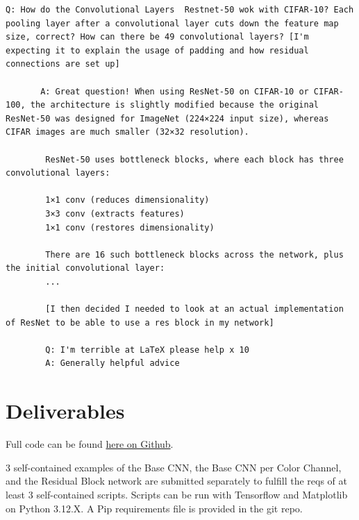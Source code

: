 \documentclass{article}
\begin{document}
    \begin{lstlisting}[language=none,label={lst:consultation2}]
       Q: How do the Convolutional Layers  Restnet-50 wok with CIFAR-10? Each pooling layer after a convolutional layer cuts down the feature map size, correct? How can there be 49 convolutional layers? [I'm expecting it to explain the usage of padding and how residual connections are set up]

       A: Great question! When using ResNet-50 on CIFAR-10 or CIFAR-100, the architecture is slightly modified because the original ResNet-50 was designed for ImageNet (224×224 input size), whereas CIFAR images are much smaller (32×32 resolution).

        ResNet-50 uses bottleneck blocks, where each block has three convolutional layers:

        1×1 conv (reduces dimensionality)
        3×3 conv (extracts features)
        1×1 conv (restores dimensionality)

        There are 16 such bottleneck blocks across the network, plus the initial convolutional layer:
        ...

        [I then decided I needed to look at an actual implementation of ResNet to be able to use a res block in my network]

        Q: I'm terrible at LaTeX please help x 10
        A: Generally helpful advice
    \end{lstlisting}

    \section{Deliverables}\label{sec:deliverables}
    Full code can be found \href{https://github.com/crimsonmagick/cosc\_592\_assign1.git}{here on Github}.

    3 self-contained examples of the Base CNN, the Base CNN per Color Channel, and the Residual Block network are submitted separately to fulfill the reqs of at least 3 self-contained scripts.
    Scripts can be run with Tensorflow and Matplotlib on Python 3.12.X\@.
    A Pip requirements file is provided in the git repo.

    
    
\end{document}
